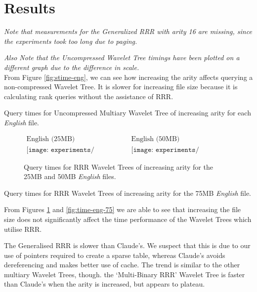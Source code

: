 \section{Results}
\label{sec:results}
\emph{Note that measurements for the Generalized RRR with arity 16 are missing, since the experiments took too long due to paging.}

\emph{Also Note that the Uncompressed Wavelet Tree timings have been plotted on 
a different graph due to the difference in scale.}\\

From Figure \ref{fig:stime-eng}, we can see how increasing the arity affects
querying a non-compressed Wavelet Tree. It is slower for increasing file size
because it is calculating rank queries without the assistance of RRR.


			{Query times for Uncompressed Multiary Wavelet Tree of increasing 
			arity for each \emph{English} file.}
		
			\begin{figure}[h]
			\begin{center}$
			\begin{array}{cc}
			\mbox{English (25MB)} & \mbox{English (50MB)} \\
			\texttt{[image: experiments/time\_english\_25MB]} &
			\texttt{[image: experiments/time\_english\_50MB]}
			\end{array}$
			\end{center}
			\caption{Query times for RRR Wavelet Trees of increasing arity
			for the 25MB and 50MB \emph{English} files.}
			\label{fig:time-eng-25-50}
			\end{figure}
		
			{Query times for RRR Wavelet Trees of increasing arity
			for the 75MB \emph{English} file.}

From Figures \ref{fig:time-eng-25-50} and \ref{fig:time-eng-75} we are able 
to see that increasing the file size does not significantly affect the time
performance of the Wavelet Trees which utilise RRR.

The Generalised RRR is slower than Claude's. We suspect that this is due to our 
use of pointers required to create a sparse table, whereas Claude's avoids 
dereferencing and makes better use of cache. The trend is similar to the
other multiary Wavelet Trees, though. the `Multi-Binary RRR' Wavelet Tree
is faster than Claude's when the arity is increased, but appears to plateau.


